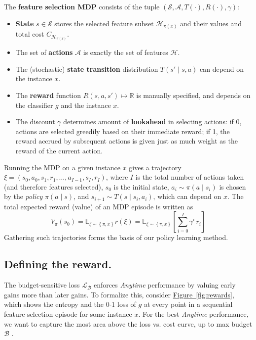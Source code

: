 \begin{mydef} \label{def:MDP}
The \textbf{feature selection MDP} consists of the tuple $(\mathcal{S}, \mathcal{A}, T(\cdot), R(\cdot), \gamma)$:

\begin{itemize}\addtolength{\itemsep}{-.55\baselineskip}
\item \textbf{State} $s \in \mathcal{S}$ stores the selected feature subset $\mathcal{H}_{\pi(x)}$ and their values and total cost $C_{\mathcal{H}_{\pi(x)}}$.
\item The set of \textbf{actions} $\mathcal{A}$ is exactly the set of features $\mathcal{H}$.
\item The (stochastic) \textbf{state transition} distribution $T(s' \mid s, a)$ can depend on the instance $x$.
\item The \textbf{reward} function $R(s, a, s') \mapsto \mathbb{R}$ is manually specified, and depends on the classifier $g$ and the instance $x$.
\item The discount $\gamma$ determines amount of \textbf{lookahead} in selecting actions: if 0, actions are selected greedily based on their immediate reward; if 1, the reward accrued by subsequent actions is given just as much weight as the reward of the current action.
\end{itemize}
\end{mydef}

Running the MDP on a given instance $x$ gives a trajectory $\xi = (s_0, a_0, s_1, r_1, \dots, a_{I-1}, s_I, r_I)$, where $I$ is the total number of actions taken (and therefore features selected), $s_0$ is the initial state, $a_i \sim \pi(a \mid s_i)$ is chosen by the \emph{policy} $\pi(a \mid s)$, and $s_{i+1} \sim T(s \mid s_i, a_i)$, which can depend on $x$.
The total expected reward (value) of an MDP episode is written as
\begin{equation} \label{eq:expected_reward}
V_\pi(s_0) =
\mathbb{E}_{\xi \sim \left\{ \pi, x \right\}} r(\xi) =
\mathbb{E}_{\xi \sim \left\{ \pi, x \right\}} \left[ \sum_{i=0}^I \gamma^i \, r_i \right]
\end{equation}
Gathering such trajectories forms the basis of our policy learning method.

\subsection{Defining the reward.}
The budget-sensitive loss $\mathcal{L}_\mathcal{B}$ enforces \emph{Anytime} performance by valuing early gains more than later gains.
To formalize this, consider \hyperref[fig:rewards]{Figure~\ref*{fig:rewards}}, which shows the entropy and the 0-1 loss of $g$ at every point in a sequential feature selection episode for some instance $x$.
For the best \emph{Anytime} performance, we want to capture the most area above the loss vs. cost curve, up to max budget $\mathcal{B}$ \parencite{Karayev-NIPS-2012}.

